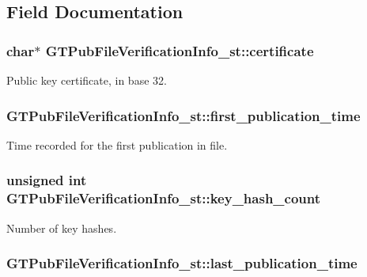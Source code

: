 \subsection{Field Documentation}
\hypertarget{struct_g_t_pub_file_verification_info__st_a341f7aa579f402725c9b0bff9b0dd3a1}{
\subsubsection[{certificate}]{\setlength{\rightskip}{0pt plus 5cm}char$\ast$ {\bf GTPubFileVerificationInfo\_\-st::certificate}}}
\label{struct_g_t_pub_file_verification_info__st_a341f7aa579f402725c9b0bff9b0dd3a1}
Public key certificate, in base 32. \hypertarget{struct_g_t_pub_file_verification_info__st_a324d8a712dc8c6e6e88a16e82bfd21bc}{
\subsubsection[{first\_\-publication\_\-time}]{ {\bf GTPubFileVerificationInfo\_\-st::first\_\-publication\_\-time}}}
\label{struct_g_t_pub_file_verification_info__st_a324d8a712dc8c6e6e88a16e82bfd21bc}
Time recorded for the first publication in file. \hypertarget{struct_g_t_pub_file_verification_info__st_ad0973ea431df05550a660dfb71033728}{
\subsubsection[{key\_\-hash\_\-count}]{\setlength{\rightskip}{0pt plus 5cm}unsigned int {\bf GTPubFileVerificationInfo\_\-st::key\_\-hash\_\-count}}}
\label{struct_g_t_pub_file_verification_info__st_ad0973ea431df05550a660dfb71033728}
Number of key hashes. \hypertarget{struct_g_t_pub_file_verification_info__st_ad850cc69e0c80addc2b113c326e463b6}{
\subsubsection[{last\_\-publication\_\-time}]{ {\bf GTPubFileVerificationInfo\_\-st::last\_\-publication\_\-time}}}
